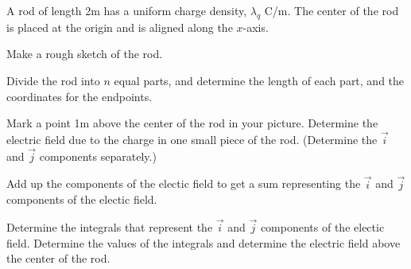 \begin{problem}
  \item  A rod of length 2m has a uniform charge density, $\lambda_q$ C/m.
  The center of the rod is placed at the origin and is aligned along the
  $x$-axis.
  \begin{subproblem}
    \item Make a rough sketch of the rod.
         \vspace{5em}
   \item Divide the rod into $n$ equal parts, and determine the length of
         each part, and the coordinates for the endpoints.
         \vspace{2em}
     \item Mark a point 1m above the center of the rod in your picture. Determine the
         electric field due to the charge in one small piece of the rod.
         (Determine the $\vec{i}$ and $\vec{j}$ components separately.)
       \vfill
     \item Add up the components of the electic field to get a sum representing the
      $\vec{i}$ and $\vec{j}$ components of the electic field.
      \vfill
    \clearpage
    \item Determine the integrals that represent the $\vec{i}$ and $\vec{j}$ components of the electic field.
      Determine the values of the integrals and determine the electric field above the center of the rod.
      \vfill
  \end{subproblem}

\end{problem}

\postClass

